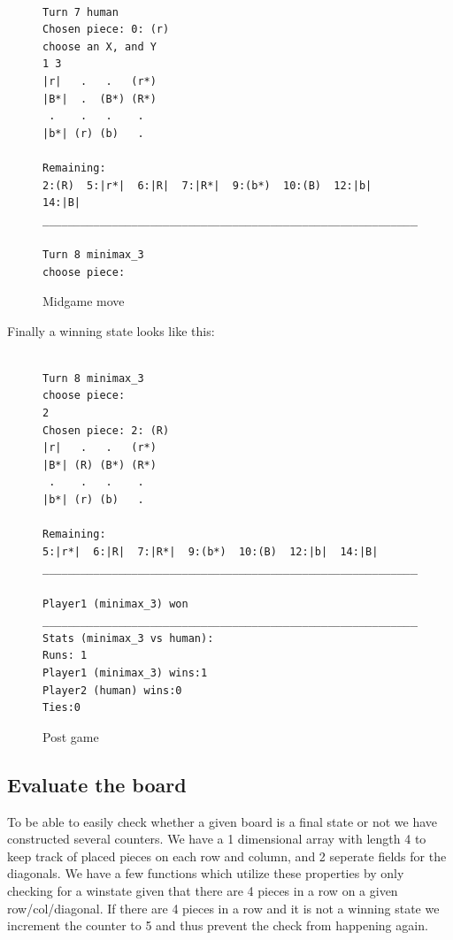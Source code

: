 \documentclass[12pt, a4paper]{article}
\begin{document}
\begin{figure}[H]
\begin{verbatim}

Turn 7 human
Chosen piece: 0: (r)
choose an X, and Y
1 3
|r|   .   .   (r*)
|B*|  .  (B*) (R*)
 .    .   .    . 
|b*| (r) (b)   . 

Remaining:
2:(R)  5:|r*|  6:|R|  7:|R*|  9:(b*)  10:(B)  12:|b|  14:|B|  
____________________________________________________________

Turn 8 minimax_3
choose piece:
\end{verbatim}
\caption{Midgame move}
\label{figure2}
\end{figure}
\noindent
Finally a winning state looks like this:\\
\begin{figure}[H]
\begin{verbatim}

Turn 8 minimax_3
choose piece:
2
Chosen piece: 2: (R)
|r|   .   .   (r*)
|B*| (R) (B*) (R*)
 .    .   .    . 
|b*| (r) (b)   . 

Remaining:
5:|r*|  6:|R|  7:|R*|  9:(b*)  10:(B)  12:|b|  14:|B|  
____________________________________________________________

Player1 (minimax_3) won
____________________________________________________________
Stats (minimax_3 vs human):
Runs: 1
Player1 (minimax_3) wins:1
Player2 (human) wins:0
Ties:0

\end{verbatim}
\caption{Post game}
\label{figure3}
\end{figure}

\subsection{Evaluate the board}
To be able to easily check whether a given board is a final state or not we have constructed several counters. We have a 1 dimensional array with length 4 to keep track of placed pieces on each row and column, and 2 seperate fields for the diagonals. We have a few functions which utilize these properties by only checking for a winstate given that there are 4 pieces in a row on a given row/col/diagonal. If there are 4 pieces in a row and it is not a winning state we increment the counter to 5 and thus prevent the check from happening again.
\end{document}
